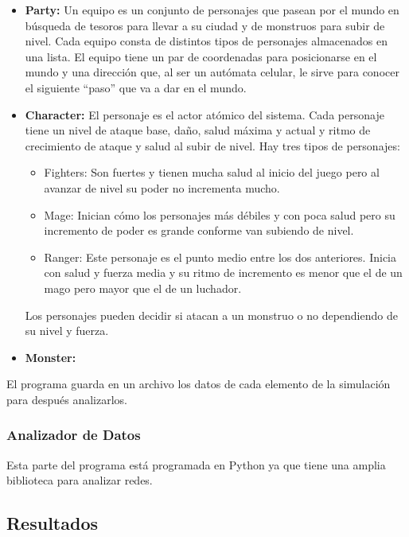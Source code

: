 {{\begin{itemize}
{        }
        \item{\textbf{Party: }Un equipo es un conjunto de personajes que pasean
            por el mundo en búsqueda de tesoros para llevar a su ciudad y de
            monstruos para subir de nivel. Cada equipo consta de distintos
            tipos de personajes almacenados en una lista. El equipo tiene un par
            de coordenadas para posicionarse en el mundo y una dirección que, al
            ser un autómata celular, le sirve para conocer el siguiente ``paso''
            que va a dar en el mundo.
        }
        \item{\textbf{Character: }El personaje es el actor atómico del sistema.
            Cada personaje tiene un nivel de ataque base, daño, salud máxima y
            actual y ritmo de crecimiento de ataque y salud al subir de nivel.
            Hay tres tipos de personajes:
            \begin{itemize}
            \item{Fighters: Son fuertes y tienen mucha salud al inicio del
                juego pero al avanzar de nivel su poder no incrementa mucho.
            }
            \item{Mage: Inician cómo los personajes más débiles y con poca
                salud pero su incremento de poder es grande conforme van
                subiendo de nivel.
            }
            \item{Ranger: Este personaje es el punto medio entre los dos
                anteriores. Inicia con salud y fuerza media y su ritmo de
                incremento es menor que el de un mago pero mayor que el de un
                luchador.
            }
            \end{itemize}
            Los personajes pueden decidir si atacan a un monstruo o no
            dependiendo de su nivel y fuerza.
        }
        \item{\textbf{Monster: }}
        \end{itemize}

        El programa guarda en un archivo los datos de cada elemento de la
        simulación para después analizarlos.
    }
    \subsubsection*{Analizador de Datos}{
        Esta parte del programa está programada en Python ya que tiene una
        amplia biblioteca para analizar redes.
    }
}

\subsection*{Resultados}{}
